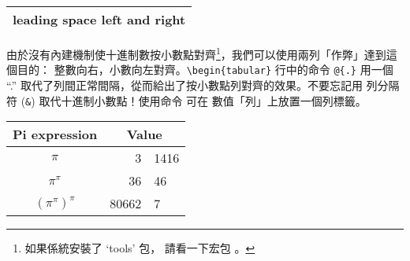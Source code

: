\begin{example}
\begin{tabular}{l}
\hline
leading space left and right\\
\hline
\end{tabular}
\end{example}

%
%

%
由於沒有內建機制使十進制數按小數點對齊\footnote{如果係統安裝了 `tools' 包，
請看一下宏包 。}，我們可以使用兩列「作弊」達到這個目的：
整數向右，小數向左對齊。\verb|\begin{tabular}| 行中的命令 \verb|@{.}| 用一個
 ``.'' 取代了列間正常間隔，從而給出了按小數點列對齊的效果。不要忘記用
列分隔符 (\verb|&|) 取代十進制小數點！使用命令  可在
數值「列」上放置一個列標籤。

\begin{example}
\begin{tabular}{c r @{.} l}
Pi expression       &
\multicolumn{2}{c}{Value} \\
\hline
$\pi$               & 3&1416  \\
$\pi^{\pi}$         & 36&46   \\
$(\pi^{\pi})^{\pi}$ & 80662&7 \\
\end{tabular}
\end{example}

